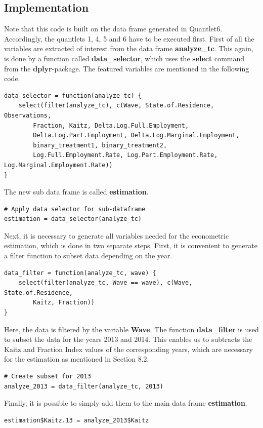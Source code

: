\documentclass[a4paper]{article}
\begin{document}
{\subsection{Implementation}
Note that this code is built on the data frame generated in Quantlet6. Accordingly, the quantlets 1, 4, 5 and 6 have to be executed first. \newline
First of all the variables are extracted of interest from the data frame \textbf{analyze\_tc}. This again, is done by a function called \textbf{data\_selector}, which uses the \textbf{select} command from the \textbf{dplyr}-package. The featured variables are mentioned in the following code.
%
\begin{lstlisting}
data_selector = function(analyze_tc) {
    select(filter(analyze_tc), c(Wave, State.of.Residence, Observations, 
    	Fraction, Kaitz, Delta.Log.Full.Employment, 
        Delta.Log.Part.Employment, Delta.Log.Marginal.Employment, 
        binary_treatment1, binary_treatment2, 
        Log.Full.Employment.Rate, Log.Part.Employment.Rate, 									Log.Marginal.Employment.Rate))
}
\end{lstlisting}
The new sub data frame is called \textbf{estimation}.
\begin{lstlisting}
# Apply data selector for sub-dataframe
estimation = data_selector(analyze_tc)
\end{lstlisting}
%
Next, it is necessary to generate all variables needed for the econometric estimation, which is done in two separate steps. First, it is convenient to generate a filter function to subset data depending on the year.
\begin{lstlisting}
data_filter = function(analyze_tc, wave) {
    select(filter(analyze_tc, Wave == wave), c(Wave, State.of.Residence, 
    	Kaitz, Fraction))
}
\end{lstlisting}
Here, the data is filtered by the variable \textbf{Wave}. The function \textbf{data\_filter} is used to subset the data for the years 2013 and 2014. This enables us to subtracts the Kaitz and Fraction Index values of the corresponding years, which are necessary for the estimation as mentioned in Section 8.2.
\begin{lstlisting}
# Create subset for 2013
analyze_2013 = data_filter(analyze_tc, 2013)
\end{lstlisting}
Finally, it is possible to simply add them to the main data frame \textbf{estimation}.
\begin{lstlisting}
estimation$Kaitz.13 = analyze_2013$Kaitz
\end{lstlisting}
}
\end{document}
